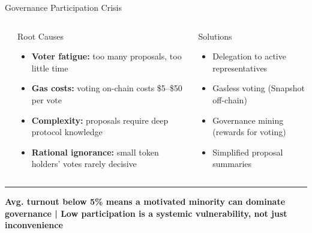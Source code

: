 \documentclass[8pt,aspectratio=169]{beamer}
\newcommand{\bottomnote}[1]{\vfill\vspace{-2mm}\textcolor{mllavender2}{\rule{\textwidth}{0.4pt}}\vspace{1mm}\footnotesize\textbf{#1}}
\begin{document}
\begin{frame}{Governance Participation Crisis}
\begin{columns}[t]
\begin{center}
\end{center}
\begin{block}{Root Causes}
\begin{itemize}\small
  \item \textbf{Voter fatigue:} too many proposals, too little time
  \item \textbf{Gas costs:} voting on-chain costs \$5--\$50 per vote
  \item \textbf{Complexity:} proposals require deep protocol knowledge
  \item \textbf{Rational ignorance:} small token holders' votes rarely decisive
\end{itemize}
\end{block}
\vspace{4pt}
\begin{block}{Solutions}
\begin{itemize}\small
  \item Delegation to active representatives
  \item Gasless voting (Snapshot off-chain)
  \item Governance mining (rewards for voting)
  \item Simplified proposal summaries
\end{itemize}
\end{block}
\end{columns}
\bottomnote{Avg. turnout below 5\% means a motivated minority can dominate governance | Low participation is a systemic vulnerability, not just inconvenience}
\end{frame}
\end{document}
